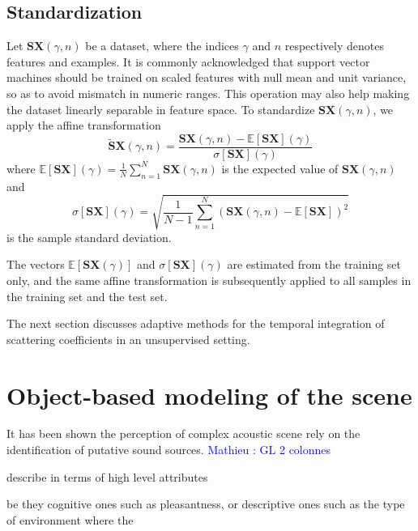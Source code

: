 \documentclass[journal]{IEEEtran}
\newcommand{\ml}[1]{\textcolor{blue}{ Mathieu : #1}}
\begin{document}
\subsection{Standardization}
Let $\mathbf{S}\boldsymbol{X}(\gamma,n)$ be a dataset, where the indices $\gamma$ and $n$ respectively denotes features and examples.
It is commonly acknowledged that support vector machines should be trained on scaled features with null mean and unit variance, so as to avoid mismatch in numeric ranges.
This operation may also help making the dataset linearly separable in feature space.
To standardize $\mathbf{S}\boldsymbol{X}(\gamma,n)$, we apply the affine transformation
\begin{equation}
\widetilde{\mathbf{S}}\boldsymbol{X}(\gamma, n) =
\dfrac{ \mathbf{S}\boldsymbol{X}(\gamma, n) -
\mathbb{E}[ \mathbf{S}\boldsymbol{X}](\gamma)}{\sigma[ \mathbf{S}\boldsymbol{X}](\gamma)}
\end{equation}
where $\mathbb{E}[ \mathbf{S}\boldsymbol{X}](\gamma) = \frac{1}{N} \sum_{n=1}^{N} \mathbf{S}\boldsymbol{X}(\gamma,n)$ is the expected value of $\mathbf{S}\boldsymbol{X}(\gamma,n)$ and
\begin{equation}
\sigma[\mathbf{S}\boldsymbol{X}] (\gamma) =
\sqrt{\frac{1}{N-1} \sum_{n=1}^{N}
\left( \mathbf{S}\boldsymbol{X}(\gamma,n) - \mathbb{E}[\mathbf{S}\boldsymbol{X}] \right)^2}
\end{equation}
 is the sample standard deviation.
 
 The vectors $\mathbb{E}[\mathbf{S}\boldsymbol{X}(\gamma)]$ and $\sigma[\mathbf{S}\boldsymbol{X}](\gamma)$ are estimated from the training set only, and the same affine transformation is subsequently applied to all samples in the training set and the test set.
 
The next section discusses adaptive methods for the temporal integration of scattering coefficients in an unsupervised setting.

\section{Object-based modeling of the scene}

It has been shown the perception of complex acoustic scene rely on the identification of putative sound sources.
\ml{GL 2 colonnes}

describe in terms of high level attributes

be they cognitive ones such as pleasantness, or descriptive ones such as the type of environment where the 
\end{document}
